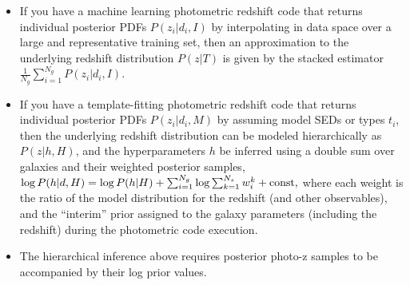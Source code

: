 \documentclass[11pt]{amsart}
\begin{document}
\begin{itemize}
    \item If you have a machine learning photometric redshift code that
    returns individual posterior PDFs $P(z_i | d_i, I)$ by interpolating
    in data space over a large and representative training set, then an
    approximation to the underlying redshift distribution $P(z | T)$ is
    given by the stacked estimator     $\frac{1}{N_g} \sum_{i=1}^{N_g}
    P(z_i | d_i, I)$.

    \item If you have a template-fitting photometric redshift code that
    returns individual posterior PDFs $P(z_i | d_i, M)$ by assuming
    model SEDs or types $t_i$, then the underlying redshift distribution
    can be modeled hierarchically as $P(z | h, H)$, and the
    hyperparameters $h$ be inferred using a double sum over galaxies and
    their weighted posterior samples,   $\log P(h|d,H) = \log P(h|H) +
    \sum_{i=1}^{N_g} \log \sum_{k=1}^{N_s} w_i^k + {\rm const,}$ where
    each weight is the ratio of the model distribution for the redshift (and other observables), and the
    ``interim'' prior assigned to the galaxy parameters (including the redshift) during the
    photometric code execution.

    \item The hierarchical inference above requires posterior photo-z
    samples to be accompanied by their log prior values.
\end{itemize}



\end{document}
